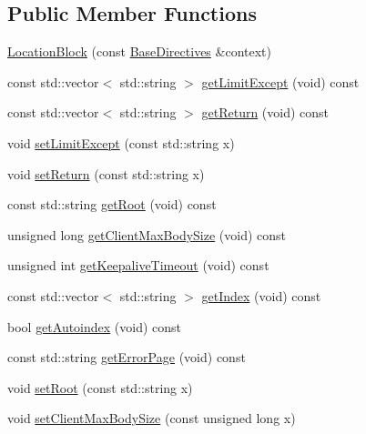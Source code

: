 \subsection*{Public Member Functions}
\begin{DoxyCompactItemize}
\item 
\hyperlink{classft_1_1_location_block_a28cbc9fd5dfde06685c8f7be5b6e0a4a}{Location\+Block} (const \hyperlink{classft_1_1_base_directives}{Base\+Directives} \&context)
\item 
const std\+::vector$<$ std\+::string $>$ \hyperlink{classft_1_1_location_block_ad2dc75d3f9c9f06f31e3948823557d52}{get\+Limit\+Except} (void) const
\item 
const std\+::vector$<$ std\+::string $>$ \hyperlink{classft_1_1_location_block_aeef5e4710c02406c46e54d4aa0c8f57c}{get\+Return} (void) const
\item 
void \hyperlink{classft_1_1_location_block_a307df676bb22688bb58396dd2c457848}{set\+Limit\+Except} (const std\+::string x)
\item 
void \hyperlink{classft_1_1_location_block_a041d07c701e052b114ef353d5e588998}{set\+Return} (const std\+::string x)
\item 
const std\+::string \hyperlink{classft_1_1_base_directives_aa5dbcb08bda0a0e7e502d2df7cf64287}{get\+Root} (void) const
\item 
unsigned long \hyperlink{classft_1_1_base_directives_a930398ba1e4b99b2ba01a60dcda0c923}{get\+Client\+Max\+Body\+Size} (void) const
\item 
unsigned int \hyperlink{classft_1_1_base_directives_ab8574338758f65325cab5d1c394826c8}{get\+Keepalive\+Timeout} (void) const
\item 
const std\+::vector$<$ std\+::string $>$ \hyperlink{classft_1_1_base_directives_a018f34a5ffd66e891494b5c0ee69177b}{get\+Index} (void) const
\item 
bool \hyperlink{classft_1_1_base_directives_a4c11ed7ad76aeac228b029a2444de568}{get\+Autoindex} (void) const
\item 
const std\+::string \hyperlink{classft_1_1_base_directives_a3cb0c21f17781de392d5ee09d7190caf}{get\+Error\+Page} (void) const
\item 
void \hyperlink{classft_1_1_base_directives_a2a7990e309f7e38f2915dbbb0d2704cf}{set\+Root} (const std\+::string x)
\item 
void \hyperlink{classft_1_1_base_directives_a39bf4922f3236043c76beaffaa557a3b}{set\+Client\+Max\+Body\+Size} (const unsigned long x)
\item 

\end{DoxyCompactItemize}
